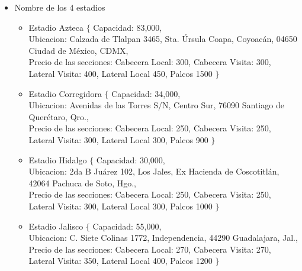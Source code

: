 \begin{itemize}
    \item Nombre de los 4 estadios
    \begin{itemize}
        \item Estadio Azteca      $\{$ Capacidad: 83,000, \\
                                       Ubicacion: Calzada de Tlalpan 3465, Sta. Úrsula Coapa, Coyoacán, 04650 Ciudad de México, CDMX,\\
                                       Precio de las secciones: Cabecera Local: 300, Cabecera Visita: 300, Lateral Visita: 400, Lateral Local 450, Palcos 1500
                                  $\}$
        \item Estadio Corregidora $\{$ Capacidad: 34,000, \\
                                       Ubicacion: Avenidas de las Torres S/N, Centro Sur, 76090 Santiago de Querétaro, Qro.,\\
                                       Precio de las secciones: Cabecera Local: 250, Cabecera Visita: 250, Lateral Visita: 300, Lateral Local 300, Palcos 900
                                  $\}$        
        \item Estadio Hidalgo     $\{$ Capacidad: 30,000, \\
                                       Ubicacion: 2da B Juárez 102, Los Jales, Ex Hacienda de Coscotitlán, 42064 Pachuca de Soto, Hgo.,\\
                                       Precio de las secciones: Cabecera Local: 250, Cabecera Visita: 250, Lateral Visita: 300, Lateral Local 300, Palcos 1000
                                  $\}$        
        \item Estadio Jalisco     $\{$ Capacidad: 55,000, \\
                                       Ubicacion: C. Siete Colinas 1772, Independencia, 44290 Guadalajara, Jal.,\\
                                       Precio de las secciones: Cabecera Local: 270, Cabecera Visita: 270, Lateral Visita: 350, Lateral Local 400, Palcos 1200
                                  $\}$           
    \end{itemize}
\end{itemize}

